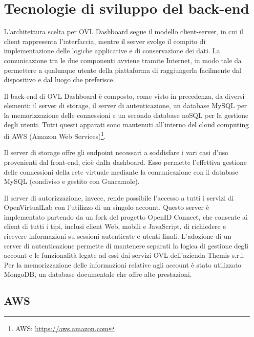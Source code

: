 \chapter{Tecnologie di sviluppo del back-end}
\label{chap:tecnologie di sviluppo del back-end}

L’architettura scelta per OVL Dashboard segue il modello client-server, in cui il client rappresenta l’interfaccia, mentre il server svolge il compito di implementazione delle logiche applicative e di conservazione dei dati. La comunicazione tra le due componenti avviene tramite Internet, in modo tale da permettere a qualunque utente della piattaforma di raggiungerla facilmente dal dispositivo e dal luogo che preferisce.

Il back-end di OVL Dashboard è composto, come visto in precedenza, da diversi elementi: il server di storage, il server di autenticazione, un database MySQL per la memorizzazione delle connessioni e un secondo database noSQL per la gestione degli utenti. Tutti questi apparati sono mantenuti all'interno del cloud computing di AWS (Amazon Web Services)\footnote{AWS: \url{https://aws.amazon.com}}.

Il server di storage offre gli endpoint necessari a soddisfare i vari casi d'uso provenienti dal front-end, cioè dalla dashboard. Esso permette l'effettiva gestione delle connessioni della rete virtuale mediante la comunicazione con il database MySQL (condiviso e gestito con Guacamole).

Il server di autorizzazione, invece, rende possibile l'accesso a tutti i servizi di OpenVirtualLab con l'utilizzo di un singolo account. Questo server è implementato partendo da un fork del progetto OpenID Connect, che consente ai client di tutti i tipi, inclusi client Web, mobili e JavaScript, di richiedere e ricevere informazioni su sessioni autenticate e utenti finali. L'adozione di un server di autenticazione permette di mantenere separati la logica di gestione degli account e le funzionalità legate ad essi dai servizi OVL dell'azienda Themis s.r.l. Per la memorizzazione delle informazioni relative agli account è stato utilizzato MongoDB, un database documentale che offre alte prestazioni.

\section{AWS}
\label{sec:AWS}

